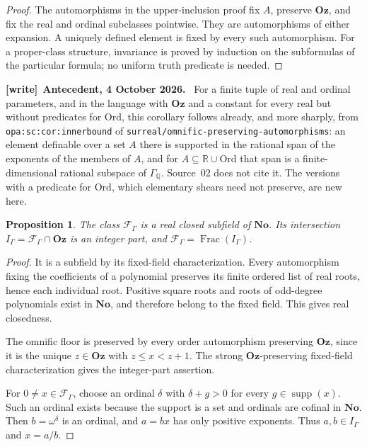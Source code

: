 \documentclass[11pt,a4paper]{article}
\numberwithin{equation}{section}
\newtheorem{proposition}[proposition]{Proposition}
\theoremstyle{definition}
\theoremstyle{remark}
\newcommand{\No}{\mathbf{No}}
\newcommand{\Oz}{\mathbf{Oz}}
\newcommand{\Ord}{\mathrm{Ord}}
\newcommand{\Q}{\mathbb Q}
\newcommand{\R}{\mathbb R}
\newcommand{\supp}{\operatorname{supp}}
\newcommand{\repopath}[1]{\nolinkurl{#1}}
\newcommand{\lbl}[1]{\nolinkurl{#1}}
\newenvironment{writenote}[1][]{\par\medskip\begingroup\small\noindent\textbf{[write]}\if\relax\detokenize{#1}\relax\else~\textbf{#1.}\fi~\ignorespaces}{\par\endgroup\medskip}
\begin{document}
\begin{proof}
The automorphisms in the upper-inclusion proof fix \(A\), preserve
\(\Oz\), and fix the real and ordinal subclasses pointwise. They are
automorphisms of either expansion. A uniquely defined element is
fixed by every such automorphism. For a proper-class structure,
invariance is proved by induction on the subformulas of the particular
formula; no uniform truth predicate is needed.
\end{proof}
\begin{writenote}[Antecedent, 4 October 2026]
For a finite tuple of real and ordinal parameters, and in the language with
$\Oz$ and a constant for every real but without predicates for $\Ord$, this
corollary follows already, and more sharply, from
\lbl{opa:sc:cor:innerbound} of
\repopath{surreal/omnific-preserving-automorphisms}: an element definable over
a set $A$ there is supported in the rational span of the exponents of the
members of $A$, and for $A\subseteq\R\cup\Ord$ that span is a
finite-dimensional rational subspace of $\Gamma_\Q$. Source~02 does not cite it. The versions
with a predicate for $\Ord$, which elementary shears need not preserve, are
new here.
\end{writenote}


\begin{proposition}\label{dsn:rp:prop:fixed-field-arithmetic}
The class \(\mathcal F_\Gamma\) is a real closed subfield of \(\No\).
Its intersection \(I_\Gamma=\mathcal F_\Gamma\cap\Oz\) is an integer part, and
\(\mathcal F_\Gamma=\operatorname{Frac}(I_\Gamma)\).
\end{proposition}

\begin{proof}
It is a subfield by its fixed-field characterization. Every
automorphism fixing the coefficients of a polynomial preserves its
finite ordered list of real roots, hence each individual root.
Positive square roots and roots of odd-degree polynomials exist in
\(\No\), and therefore belong to the fixed field. This gives real
closedness.

The omnific floor is preserved by every order automorphism preserving
\(\Oz\), since it is the unique \(z\in\Oz\) with \(z\le x<z+1\).
The strong \(\Oz\)-preserving fixed-field characterization gives the
integer-part assertion.

For \(0\ne x\in\mathcal F_\Gamma\), choose an ordinal \(\delta\) with
\(\delta+g>0\) for every \(g\in\supp(x)\). Such an ordinal exists
because the support is a set and ordinals are cofinal in \(\No\).
Then \(b=\omega^\delta\) is an ordinal, and \(a=bx\) has only positive
exponents. Thus \(a,b\in I_\Gamma\) and \(x=a/b\).
\end{proof}
\end{document}
